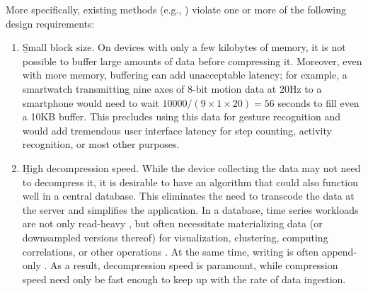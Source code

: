 More specifically, existing methods (e.g., \cite{sax, tsCompressSmartGrid, ecgCompressLossy, apca, lz4, zstd, zlib, gzip, lemireSegmentation}) violate one or more of the following design requirements:

\begin{enumerate}
\item \b{Small block size}. On devices with only a few kilobytes of memory, it is not possible to buffer large amounts of data before compressing it. Moreover, even with more memory, buffering can add unacceptable latency; for example, a smartwatch transmitting nine axes of 8-bit motion data at 20Hz to a smartphone would need to wait $10000 / (9 \times 1 \times 20) = 56$ seconds to fill even a 10KB buffer. This precludes using this data for gesture recognition and would add tremendous user interface latency for step counting, activity recognition, or most other purposes.
\item \b{High decompression speed}. While the device collecting the data may not need to decompress it, it is desirable to have an algorithm that could also function well in a central database. This eliminates the need to transcode the data at the server and simplifies the application. In a database, time series workloads are not only read-heavy \cite{respawnDB, berkeleyTreeDB, influxDB}, but often necessitate materializing data (or downsampled versions thereof) for visualization, clustering, computing correlations, or other operations \cite{respawnDB}. At the same time, writing is often append-only \cite{gorilla, respawnDB}. As a result, decompression speed is paramount, while compression speed need only be fast enough to keep up with the rate of data ingestion.

\end{enumerate}

